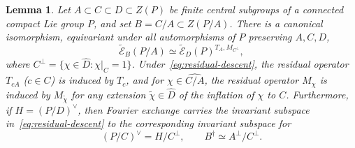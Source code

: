 \documentclass[11pt,a4paper,reqno]{amsart}
\theoremstyle{plain}
\newtheorem{lemma}[theorem]{Lemma}
\theoremstyle{definition}
\theoremstyle{remark}
\numberwithin{equation}{section}
\newcommand{\wtE}{\widetilde{\mathcal E}}
\begin{document}
\begin{lemma}\label{lem:residual-descent}
Let $A\subset C\subset D\subset Z(P)$ be finite central subgroups of a connected compact Lie group $P$, and set $B=C/A\subset Z(P/A)$. There is a canonical isomorphism, equivariant under all automorphisms of $P$ preserving $A,C,D$,
\begin{equation}\label{eq:residual-descent}
\wtE_B(P/A)\simeq\wtE_D(P)^{T_A,M_{C^\perp}},
\end{equation}
where $C^\perp=\{\chi\in\widehat D:\chi|_C=1\}$. Under~\eqref{eq:residual-descent}, the residual operator $T_{cA}$ ($c\in C$) is induced by $T_c$, and for $\chi\in\widehat{C/A}$, the residual operator $M_\chi$ is induced by $M_{\widetilde\chi}$ for any extension $\widetilde\chi\in\widehat D$ of the inflation of $\chi$ to $C$. Furthermore, if $H=(P/D)^\vee$, then Fourier exchange carries the invariant subspace in~\eqref{eq:residual-descent} to the corresponding invariant subspace for
\[
(P/C)^\vee=H/C^\perp,\qquad B^\dagger\simeq A^\perp/C^\perp.
\]
\end{lemma}
\end{document}
